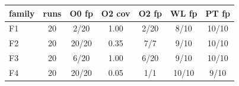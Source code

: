 \begin{tabular}{lcccccc}
\toprule
family & runs & O0 fp & O2 cov & O2 fp & WL fp & PT fp \\
\midrule
F1 & 20 & 2/20 & 1.00 & 2/20 & 8/10 & 10/10 \\
F2 & 20 & 20/20 & 0.35 & 7/7 & 9/10 & 10/10 \\
F3 & 20 & 6/20 & 1.00 & 6/20 & 9/10 & 10/10 \\
F4 & 20 & 20/20 & 0.05 & 1/1 & 10/10 & 9/10 \\
\bottomrule
\end{tabular}
